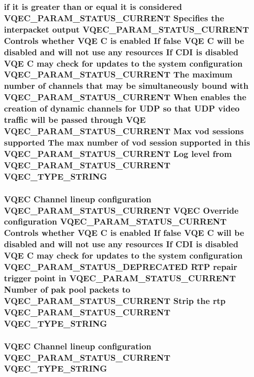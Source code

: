 \subsubsection{\setlength{\rightskip}{0pt plus 5cm}if it is greater than or equal it is considered VQEC\_\-PARAM\_\-STATUS\_\-CURRENT Specifies the interpacket output VQEC\_\-PARAM\_\-STATUS\_\-CURRENT Controls whether VQE \bf{C} is enabled If false VQE \bf{C} will be disabled and will not use any resources If CDI is disabled VQE \bf{C} may check for updates \bf{to} the system configuration VQEC\_\-PARAM\_\-STATUS\_\-CURRENT The maximum number of \bf{channels} that may be simultaneously bound with VQEC\_\-PARAM\_\-STATUS\_\-CURRENT When enables the creation of dynamic \bf{channels} for UDP so that UDP video traffic will be passed through VQE VQEC\_\-PARAM\_\-STATUS\_\-CURRENT Max vod sessions supported The max number of vod session supported in \bf{this} VQEC\_\-PARAM\_\-STATUS\_\-CURRENT Log level from VQEC\_\-PARAM\_\-STATUS\_\-CURRENT \bf{VQEC\_\-TYPE\_\-STRING}}\label{vqec__cfg__settings_8h_cf5b8a7ae8e220460bcf697d3993055f}


\subsubsection{\setlength{\rightskip}{0pt plus 5cm}VQEC Channel lineup configuration VQEC\_\-PARAM\_\-STATUS\_\-CURRENT VQEC Override configuration VQEC\_\-PARAM\_\-STATUS\_\-CURRENT Controls whether VQE \bf{C} is enabled If false VQE \bf{C} will be disabled and will not use any resources If CDI is disabled VQE \bf{C} may check for updates \bf{to} the system configuration VQEC\_\-PARAM\_\-STATUS\_\-DEPRECATED RTP repair trigger point in VQEC\_\-PARAM\_\-STATUS\_\-CURRENT Number of pak pool packets \bf{to} VQEC\_\-PARAM\_\-STATUS\_\-CURRENT Strip the rtp VQEC\_\-PARAM\_\-STATUS\_\-CURRENT \bf{VQEC\_\-TYPE\_\-STRING}}\label{vqec__cfg__settings_8h_b121988872f77ebb941a0b558d272cdd}


\subsubsection{\setlength{\rightskip}{0pt plus 5cm}VQEC Channel lineup configuration VQEC\_\-PARAM\_\-STATUS\_\-CURRENT \bf{VQEC\_\-TYPE\_\-STRING}}\label{vqec__cfg__settings_8h_ff95e1faf4dc02361e611526770f4aa1}


